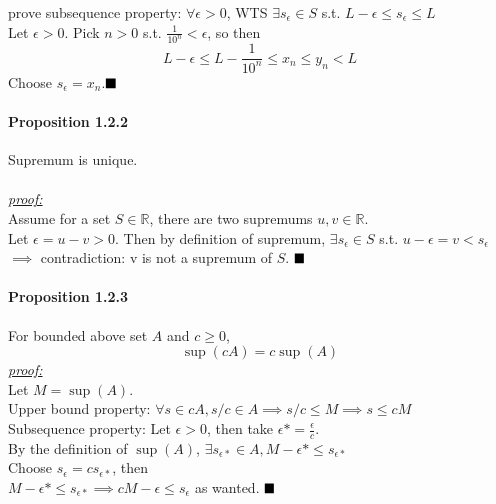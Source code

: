 \documentclass[11pt]{article}
\newcommand{\real}[0]{\mathbb{R}}
\newcommand{\proof}[0]{\textit{\underline{proof:} }}
\newcommand{\qed}[0]{$\hfill\blacksquare$}
\begin{document}
prove subsequence property: $\forall \epsilon >0$, WTS $\exists s_\epsilon \in S$ s.t. $L - \epsilon \leq s_\epsilon \leq L$\\
Let $\epsilon >0$. Pick $n > 0$ s.t. $\frac{1}{10^n} < \epsilon$, so then
$$L - \epsilon \leq L - \frac{1}{10^n} \leq x_n \leq y_n < L$$
Choose $s_\epsilon = x_n$.\qed


\paragraph{Proposition 1.2.2} Supremum is unique. \\\\
\proof\\
Assume for a set $S \in \real$, there are two supremums $u,v \in \real$. \\
Let $\epsilon = u - v > 0$.
Then by definition of supremum, $\exists s_\epsilon \in S $ s.t. $u - \epsilon = v < s_\epsilon$\\
$\implies$ contradiction: v is not a supremum of $S$. \qed
\paragraph{Proposition 1.2.3} For bounded above set $A$ and $c \geq 0$, $$\sup(cA) = c\sup(A)$$
\proof \\
Let $M = \sup(A)$.\\
Upper bound property: $\forall s \in cA, s/c \in A \implies s/c \leq M \implies s \leq cM$ \\
Subsequence property: Let $\epsilon > 0$, then take $\epsilon* = \frac{\epsilon}{c}$.\\
By the definition of $\sup(A)$, $\exists s_{\epsilon*} \in A, M - \epsilon* \leq s_{\epsilon*}$\\
Choose $s_\epsilon = cs_{\epsilon*}$, then \\
$M - \epsilon* \leq s_{\epsilon*} \implies cM - \epsilon \leq s_\epsilon$ as wanted. \qed
\end{document}
